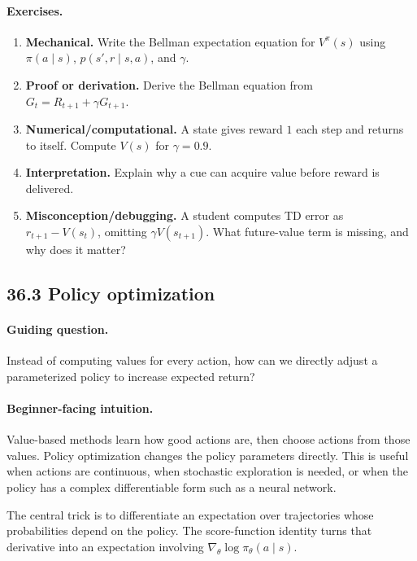 \paragraph{Exercises.}
\begin{enumerate}[label=\textbf{36.2.\arabic*.}, leftmargin=*]
\item \textbf{Mechanical.} Write the Bellman expectation equation for \(V^\pi(s)\) using \(\pi(a\mid s)\), \(p(s',r\mid s,a)\), and \(\gamma\).
\item \textbf{Proof or derivation.} Derive the Bellman equation from \(G_t=R_{t+1}+\gamma G_{t+1}\).
\item \textbf{Numerical/computational.} A state gives reward \(1\) each step and returns to itself. Compute \(V(s)\) for \(\gamma=0.9\).
\item \textbf{Interpretation.} Explain why a cue can acquire value before reward is delivered.
\item \textbf{Misconception/debugging.} A student computes TD error as \(r_{t+1}-V(s_t)\), omitting \(\gamma V(s_{t+1})\). What future-value term is missing, and why does it matter?
\end{enumerate}

\subsection{36.3 Policy optimization}

\paragraph{Guiding question.}
Instead of computing values for every action, how can we directly adjust a parameterized policy to increase expected return?

\paragraph{Beginner-facing intuition.}
Value-based methods learn how good actions are, then choose actions from those values. Policy optimization changes the policy parameters directly. This is useful when actions are continuous, when stochastic exploration is needed, or when the policy has a complex differentiable form such as a neural network.

The central trick is to differentiate an expectation over trajectories whose probabilities depend on the policy. The score-function identity turns that derivative into an expectation involving \(\nabla_\theta\log\pi_\theta(a\mid s)\).

